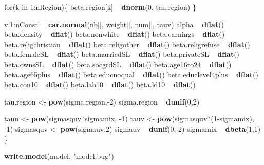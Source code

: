 \documentclass[12pt,twoside]{article}
\newenvironment{Shaded}{}{}
\newcommand{\KeywordTok}[1]{\textcolor[rgb]{0.00,0.44,0.13}{\textbf{{#1}}}}
\newcommand{\DecValTok}[1]{\textcolor[rgb]{0.25,0.63,0.44}{{#1}}}
\newcommand{\StringTok}[1]{\textcolor[rgb]{0.25,0.44,0.63}{{#1}}}
\newcommand{\NormalTok}[1]{{#1}}
\begin{document}
\begin{Shaded}
\begin{Highlighting}[]
    \NormalTok{for(k in }\DecValTok{1}\NormalTok{:nRegion)\{}
        \NormalTok{beta.region[k] ~}\StringTok{ }\KeywordTok{dnorm}\NormalTok{(}\DecValTok{0}\NormalTok{, tau.region)}
    \NormalTok{\}}

    \NormalTok{v[}\DecValTok{1}\NormalTok{:nConst] ~}\StringTok{ }\KeywordTok{car.normal}\NormalTok{(nb[], weight[], num[], tauv)}
    \NormalTok{alpha ~}\StringTok{ }\KeywordTok{dflat}\NormalTok{()}
    \NormalTok{beta.density ~}\StringTok{ }\KeywordTok{dflat}\NormalTok{()}
    \NormalTok{beta.nonwhite ~}\StringTok{ }\KeywordTok{dflat}\NormalTok{()}
    \NormalTok{beta.earnings ~}\StringTok{ }\KeywordTok{dflat}\NormalTok{()}
    \NormalTok{beta.religchristian ~}\StringTok{ }\KeywordTok{dflat}\NormalTok{()}
    \NormalTok{beta.religother ~}\StringTok{ }\KeywordTok{dflat}\NormalTok{()}
    \NormalTok{beta.religrefuse ~}\StringTok{ }\KeywordTok{dflat}\NormalTok{()}
    \NormalTok{beta.femaleSL ~}\StringTok{ }\KeywordTok{dflat}\NormalTok{()}
    \NormalTok{beta.marriedSL ~}\StringTok{ }\KeywordTok{dflat}\NormalTok{()}
    \NormalTok{beta.privateSL  ~}\StringTok{ }\KeywordTok{dflat}\NormalTok{()}
    \NormalTok{beta.ownsSL  ~}\StringTok{ }\KeywordTok{dflat}\NormalTok{()}
    \NormalTok{beta.socgrdSL ~}\StringTok{ }\KeywordTok{dflat}\NormalTok{()}
    \NormalTok{beta.age16to24 ~}\StringTok{ }\KeywordTok{dflat}\NormalTok{()}
    \NormalTok{beta.age65plus ~}\StringTok{ }\KeywordTok{dflat}\NormalTok{()}
    \NormalTok{beta.educnoqual ~}\StringTok{ }\KeywordTok{dflat}\NormalTok{()}
    \NormalTok{beta.educlevel4plus ~}\StringTok{ }\KeywordTok{dflat}\NormalTok{()}
    \NormalTok{beta.con10 ~}\StringTok{ }\KeywordTok{dflat}\NormalTok{()}
    \NormalTok{beta.lab10 ~}\StringTok{ }\KeywordTok{dflat}\NormalTok{()}
    \NormalTok{beta.ld10 ~}\StringTok{ }\KeywordTok{dflat}\NormalTok{()}

    \NormalTok{tau.region <-}\StringTok{ }\KeywordTok{pow}\NormalTok{(sigma.region,-}\DecValTok{2}\NormalTok{)}
    \NormalTok{sigma.region ~}\StringTok{ }\KeywordTok{dunif}\NormalTok{(}\DecValTok{0}\NormalTok{,}\DecValTok{2}\NormalTok{)}

    \NormalTok{tauu <-}\StringTok{ }\KeywordTok{pow}\NormalTok{(sigmasquv*sigmamix, -}\DecValTok{1}\NormalTok{)}
    \NormalTok{tauv <-}\StringTok{ }\KeywordTok{pow}\NormalTok{(sigmasquv*(}\DecValTok{1}\NormalTok{-sigmamix), -}\DecValTok{1}\NormalTok{)}
    \NormalTok{sigmasquv <-}\StringTok{ }\KeywordTok{pow}\NormalTok{(sigmauv,}\DecValTok{2}\NormalTok{)}
    \NormalTok{sigmauv ~}\StringTok{ }\KeywordTok{dunif}\NormalTok{(}\DecValTok{0}\NormalTok{, }\DecValTok{2}\NormalTok{)}
    \NormalTok{sigmamix ~}\StringTok{  }\KeywordTok{dbeta}\NormalTok{(}\DecValTok{1}\NormalTok{,}\DecValTok{1}\NormalTok{)}
\NormalTok{\}}

\KeywordTok{write.model}\NormalTok{(model, }\StringTok{"model.bug"}\NormalTok{)}
\end{Highlighting}
\end{Shaded}
\end{document}
